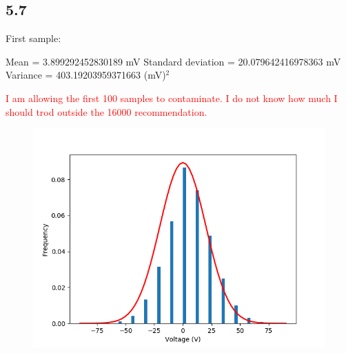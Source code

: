\documentclass[a4paper]{article}
\begin{document}

\subsection{5.7}

First sample:

Mean = 3.899292452830189 mV
Standard deviation = 20.079642416978363 mV
Variance = 403.19203959371663 (mV)$^2$

\textcolor{red}{I am allowing the first 100 samples to contaminate. I do not know how much I should trod outside the 16000 recommendation.}

\begin{figure}
\centering
\includegraphics[width=.45\linewidth]{5-7/histo}
\caption{}
\label{fig:histogram}
\end{figure}
\end{document}
